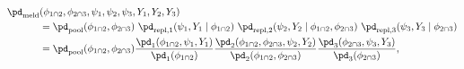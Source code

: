 \begin{align}
  \pd_{\text{meld}} &(\phi_{1 \cap 2}, \phi_{2 \cap 3}, \psi_{1}, \psi_{2}, \psi_{3}, Y_{1}, Y_{2}, Y_{3}) \\
    &= \pd_{\text{pool}}(\phi_{1 \cap 2}, \phi_{2 \cap 3}) \,\,
    \pd_{\text{repl}, 1} (\psi_{1}, Y_{1} \mid \phi_{1 \cap 2}) \,\,
    \pd_{\text{repl}, 2} (\psi_{2}, Y_{2} \mid \phi_{1 \cap 2}, \phi_{2 \cap 3}) \,\,
    \pd_{\text{repl}, 3} (\psi_{3}, Y_{3} \mid \phi_{2 \cap 3}) \label{eqn:melded-model-cond} \\
    &= \pd_{\text{pool}}(\phi_{1 \cap 2}, \phi_{2 \cap 3})
    \frac {
      \pd_{1} (\phi_{1 \cap 2}, \psi_{1}, Y_{1})
    } {
      \pd_{1}(\phi_{1 \cap 2})
    }
    \frac {
      \pd_{2} (\phi_{1 \cap 2}, \phi_{2 \cap 3}, \psi_{2}, Y_{2})
    } {
      \pd_{2}(\phi_{1 \cap 2}, \phi_{2 \cap 3})
    }
    \frac {
      \pd_{3} (\phi_{2 \cap 3}, \psi_{3}, Y_{3})
    } {
      \pd_{3}(\phi_{2 \cap 3})
    },
  \label{eqn:melded-model-full}
\end{align}